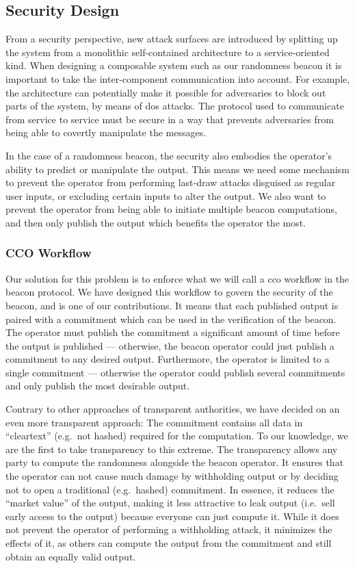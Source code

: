 \subsection{Security Design}%
\label{sub:security_design}

From a security perspective, new attack surfaces are introduced by splitting up the system from a monolithic self-contained architecture to a service-oriented kind.
When designing a composable system such as our randomness beacon it is important to take the inter-component communication into account.
For example, the architecture can potentially make it possible for adversaries to block out parts of the system, by means of \gls{dos} attacks.
The protocol used to communicate from service to service must be secure in a way that prevents adversaries from being able to covertly manipulate the messages.

In the case of a randomness beacon, the security also embodies the operator's ability to predict or manipulate the output.
This means we need some mechanism to prevent the operator from performing last-draw attacks disguised as regular user inputs, or excluding certain inputs to alter the output.
We also want to prevent the operator from being able to initiate multiple beacon computations, and then only publish the output which benefits the operator the most.

\subsubsection{CCO Workflow}
Our solution for this problem is to enforce what we will call a \gls{cco} workflow in the beacon protocol. We have designed this workflow to govern the security of the beacon, and is one of our contributions.
It means that each published output is paired with a commitment which can be used in the verification of the beacon.
The operator must publish the commitment a significant amount of time before the output is published --- otherwise, the beacon operator could just publish a commitment to any desired output.
Furthermore, the operator is limited to a single commitment --- otherwise the operator could publish several commitments and only publish the most desirable output.

Contrary to other approaches of transparent authorities, we have decided on an even more transparent approach: The commitment contains all data in \enquote{cleartext} (e.g.\ not hashed) required for the computation. To our knowledge, we are the first to take transparency to this extreme.
The transparency allows any party to compute the randomness alongside the beacon operator.
It ensures that the operator can not cause much damage by withholding output or by deciding not to open a traditional (e.g.\ hashed) commitment. In essence, it reduces the \enquote{market value} of the output, making it less attractive to leak output (i.e.\ sell early access to the output) because everyone can just compute it. While it does not prevent the operator of performing a withholding attack, it minimizes the effects of it, as others can compute the output from the commitment and still obtain an equally valid output.

